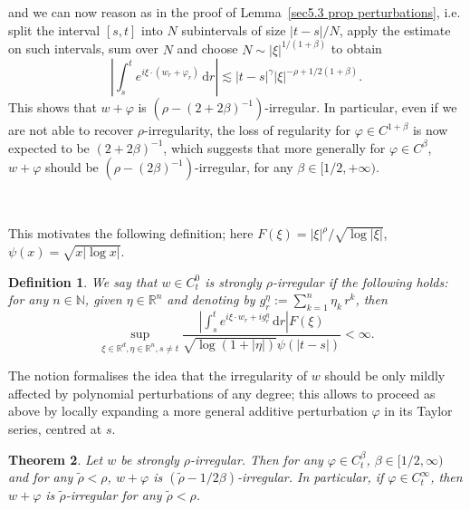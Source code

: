 \documentclass[10pt]{article}
\newcommand{\assign}{:=}
\newcommand{\mathd}{\mathrm{d}}
\newtheorem{theorem}{Theorem}
\newtheorem{definition}[theorem]{Definition}
\begin{document}
and we can now reason as in the proof of Lemma~\ref{sec5.3 prop
perturbations}, i.e. split the interval $[s, t]$ into $N$ subintervals of size
$| t - s | / N$, apply the estimate on such intervals, sum over $N$ and choose
$N \sim | \xi |^{1 / (1 + \beta)}$ to obtain
\[ \left| \int_s^t e^{i \xi \cdot (w_r + \varphi_r)} \, \mathd r \right|
   \lesssim | t - s |^{\gamma} | \xi |^{- \rho + 1 / 2 (1 + \beta)} . \]
This shows that $w + \varphi$ is $(\rho - (2 + 2 \beta)^{-
1})$\mbox{-}irregular. In particular, even if we are not able to recover
$\rho$\mbox{-}irregularity, the loss of regularity for $\varphi \in C^{1 +
\beta}$ is now expected to be $(2 + 2 \beta)^{- 1}$, which suggests that more
generally for $\varphi \in C^{\beta}$, $w + \varphi$ should be $(\rho - (2
\beta)^{- 1})$\mbox{-}irregular, for any $\beta \in [1 / 2, + \infty)$.

\

This motivates the following definition; here $F (\xi) = | \xi |^{\rho} /
\sqrt{\log | \xi |}$, $\psi (x) = \sqrt{x | \log x |}$.

\begin{definition}
  \label{sec5.3 defn strong rho}We say that $w \in C^0_t$ is strongly
  $\rho$\mbox{-}irregular if the following holds: for any $n \in \mathbb{N}$,
  given $\eta \in \mathbb{R}^n$ and denoting by $g^{\eta}_r \assign \sum_{k =
  1}^n \eta_k \, r^k$, then
  \begin{equation}
    \sup_{\xi \in \mathbb{R}^d, \eta \in \mathbb{R}^n, s \neq t} \frac{\left|
    \int_s^t e^{i \xi \cdot w_r + i g^{\eta}_r} \, \mathd r \right| F
    (\xi)}{\sqrt{\log (1 + | \eta |)} \psi (| t - s |)} < \infty .
  \end{equation}
\end{definition}

The notion formalises the idea that the irregularity of $w$ should be only
mildly affected by polynomial perturbations of any degree; this allows to
proceed as above by locally expanding a more general additive perturbation
$\varphi$ in its Taylor series, centred at $s$.

\begin{theorem}
  \label{sec5.3 thm perturbation strong}Let $w$ be strongly $\rho$-irregular.
  Then for any $\varphi \in C^{\beta}_t$, $\beta \in [1 / 2, \infty)$ and for
  any $\tilde{\rho} < \rho$, $w + \varphi$ is $(\tilde{\rho} - 1 / 2
  \beta)$-irregular. In particular, if $\varphi \in C_t^{\infty}$, then $w +
  \varphi$ is $\tilde{\rho}$-irregular for any $\tilde{\rho} < \rho$.
\end{theorem}
\end{document}

